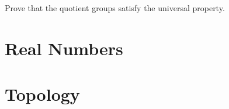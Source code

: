 \documentclass[10pt]{article}
\begin{document}
\begin{center}
\end{center}
\begin{problem}
    Prove that the quotient groups satisfy the universal property.
\end{problem}
\begin{proposition}
    
\end{proposition}










\newpage
\section{Real Numbers}
\newpage
\section{Topology}







\hindex
\end{document}
